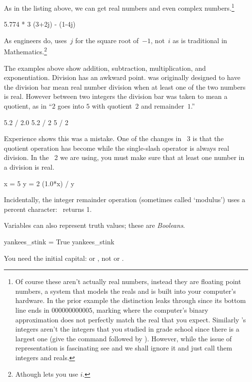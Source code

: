 As in the listing above, we can get real 
numbers 
and even complex numbers.\footnote{Of course these aren't actually 
real numbers, instead they are floating point numbers, a system that
models the reals and is built into your computer's hardware.
In the prior example the distinction leaks through
since its bottom line ends in $000000000005$, marking where
the computer's binary approximation does not perfectly match
the real that you expect.
Similarly \protect\python's integers aren't the integers that you studied
in grade school since there is a largest one (give \python{} the 
command \protect{} followed by 
\protect{}). 
However, while the issue of representation is fascinating\protect\Dash
see \protect\cite{PythonTeam12a} and \protect\cite{Goldberg91}\protect\Dash
we shall ignore it and just call them integers and reals.}
\begin{pyconsole}
5.774 * 3
(3+2j) - (1-4j)
\end{pyconsole}
\noindent As engineers do, \python{} uses~$j$ for the square
root of~$-1$, not~$i$ as is traditional in Mathematics.\footnote{Athough
\protect\Sage{} lets you use $i$.}

The examples above show addition, subtraction, multiplication, 
and exponentiation. 
Division has an awkward point.
\python{} was originally designed to have the division bar
\inlinecode{/} mean real number division 
when at least one of the two numbers is real.
However between two integers the division bar was taken to mean 
a quotient, as in ``$2$ goes into $5$ with quotient~$2$ and remainder~$1$.''
\begin{pyconsole}
5.2 / 2.0
5.2 / 2
5 / 2
\end{pyconsole}
Experience shows this was a mistake. 
One of the changes in \python~3
is that the quotient operation has become \inlinecode{//}
while the single-slash operator is always real division.
In the \python~2 we are using, you must make sure that at least one
number in a division is real.
\begin{pyconsole}
x = 5
y = 2
(1.0*x) / y
\end{pyconsole}
\noindent Incidentally, 
the integer remainder operation (sometimes called `modulus')  
uses a percent character:~ returns 1.

Variables can also represent truth values; these are \textit{Booleans}.
\begin{pyconsole}
yankees_stink = True
yankees_stink
\end{pyconsole}
\noindent You need the initial capital:
or , not
or .
 
